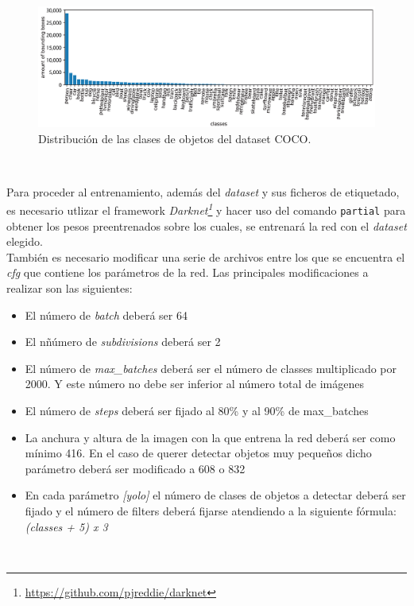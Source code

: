 \begin{figure} [h!]
	\begin{center}
		\includegraphics[width=14cm]{figs/graphcoco}
	\end{center}
	\caption{Distribución de las clases de objetos del dataset COCO.}
	\label{fig:graphcoco}
\end{figure}\

Para proceder al entrenamiento, además del \textit{dataset} y sus ficheros de etiquetado, es necesario utlizar el framework \textit{Darknet\footnote{\url{https://github.com/pjreddie/darknet}}} y hacer uso del comando \verb|partial| para obtener los pesos preentrenados sobre los cuales, se entrenará la red con el \textit{dataset} elegido.\\

También es necesario modificar una serie de archivos entre los que se encuentra el \textit{cfg} que contiene los parámetros de la red. Las principales modificaciones a realizar son las siguientes:
\begin{itemize}
	\item El número de \textit{batch} deberá ser 64
	\item El nñúmero de \textit{subdivisions} deberá ser 2
	\item El número de \textit{max\_batches} deberá ser el número de classes multiplicado por 2000. Y este número no debe ser inferior al número total de imágenes
	\item El número de \textit{steps} deberá ser fijado al 80\% y al 90\% de max\_batches
	\item La anchura y altura de la imagen con la que entrena la red deberá ser como mínimo 416. En el caso de querer detectar objetos muy pequeños dicho parámetro deberá ser modificado a 608 o 832
	\item En cada parámetro \textit{[yolo]} el número de clases de objetos a detectar deberá ser fijado y el número de filters deberá fijarse atendiendo a la siguiente fórmula: \textit{(classes + 5) x 3}
\end{itemize}\

